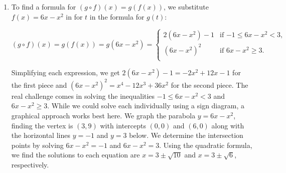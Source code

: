 \documentclass{ximera}
\begin{document}
\begin{example}
\begin{explanation}
\begin{enumerate}
\begin{enumerate}
\item Since  $(h\circ g)(-1) = h(g(-1))$ we first need $g(-1)$.  Since $-1 \leq -1 < 3$, we use the rule $g(t) = 2t-1$ and find $g(-1) = 2(-1)-1 = -3$. Next, we need $h(-3)$.  Since  $(-3, 1) \in h$, we have that $h(-3) =1$.  Putting it all together, we find $(h\circ g)(-1)  = h(g(-1)) = h(-3) = 1$.

\item To find  $(h \circ s)(-2) = h(s(-2))$ , we first need $s(-2)$.  We see the point $(-2,3)$ is on the graph of $s$, so $s(-2) = 3$.  Next, we see $(3,-1) \in h$, so $h(3) = -1$.  Hence,  $(h \circ s)(-2) = h(s(-2)) = h(3) = -1$.

\item  To find $(f \circ s)(0) = f(s(0))$ we infer from the graph of $s$ that it contains the point $(0,3)$, so $s(0) = 3$. Sine $f(3) = 6(3) - (3)^2 = 9$, we have $(f \circ s)(0) = f(s(0)) = f(3) = 9$.

\end{enumerate}

\item  To find a formula for $(g \circ f)(x) = g(f(x))$, we substitute $f(x) = 6x-x^2$ in for $t$ in the formula for $g(t)$: 

\[ (g \circ f)(x) = g(f(x)) = g(6x-x^2) =   \begin{cases}   2(6x-x^2) -1 &  \text{if $-1 \leq 6x-x^2  < 3$, } \\  (6x-x^2)^2  & \text{if $6x-x^2 \geq 3$.} \\ \end{cases}\]

Simplifying each expression, we get  $ 2(6x-x^2) -1 = -2x^2+12x-1$  for the first piece and $(6x-x^2)^2 = x^4 - 12x^3 +36x^2$ for the second piece.  The real challenge comes in  solving the inequalities   $-1 \leq 6x-x^2  < 3$ and $6x-x^2 \geq 3$.  While we could solve each individually using a sign diagram, a graphical approach works best here.  We graph the parabola $y = 6x-x^2$, finding the vertex is $(3, 9)$ with intercepts $(0,0)$ and $(6,0)$ along with the horizontal lines $y = -1$ and $y=3$ below.  We determine the intersection points by solving $6x-x^2=-1$ and $6x-x^2=3$.  Using the quadratic formula, we find the solutions to each equation are $x = 3 \pm \sqrt{10}$ and $x = 3 \pm \sqrt{6}$, respectively. 

\begin{center}


\end{center}
\end{enumerate}
\end{explanation}
\end{example}
\end{document}
